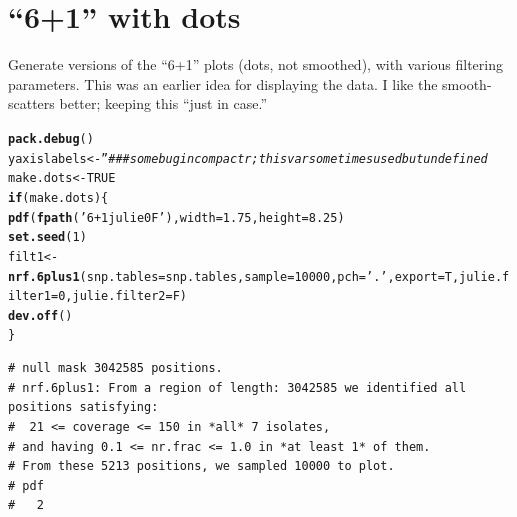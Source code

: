 \documentclass{article}\usepackage[]{graphicx}\usepackage[]{color}
\makeatletter
\newcommand{\hlnum}[1]{\textcolor[rgb]{0.686,0.059,0.569}{#1}}%
\newcommand{\hlstr}[1]{\textcolor[rgb]{0.192,0.494,0.8}{#1}}%
\newcommand{\hlcom}[1]{\textcolor[rgb]{0.678,0.584,0.686}{\textit{#1}}}%
\newcommand{\hlstd}[1]{\textcolor[rgb]{0.345,0.345,0.345}{#1}}%
\newcommand{\hlkwa}[1]{\textcolor[rgb]{0.161,0.373,0.58}{\textbf{#1}}}%
\newcommand{\hlkwb}[1]{\textcolor[rgb]{0.69,0.353,0.396}{#1}}%
\newcommand{\hlkwc}[1]{\textcolor[rgb]{0.333,0.667,0.333}{#1}}%
\newcommand{\hlkwd}[1]{\textcolor[rgb]{0.737,0.353,0.396}{\textbf{#1}}}%
\newenvironment{kframe}{%
 \def\at@end@of@kframe{}%
 \ifinner\ifhmode%
  \def\at@end@of@kframe{\end{minipage}}%
  \begin{minipage}{\columnwidth}%
 \fi\fi%
 \def\FrameCommand##1{\hskip\@totalleftmargin \hskip-\fboxsep
 \colorbox{shadecolor}{##1}\hskip-\fboxsep
     \hskip-\linewidth \hskip-\@totalleftmargin \hskip\columnwidth}%
 \MakeFramed {\advance\hsize-\width
   \@totalleftmargin\z@ \linewidth\hsize
   \@setminipage}}%
 {\par\unskip\endMakeFramed%
 \at@end@of@kframe}
\newenvironment{knitrout}{}{} %
\makeatother
\begin{document}
\section{``6+1'' with dots}

Generate versions of the ``6+1'' plots (dots, not smoothed), with various filtering parameters.  This was an earlier idea for displaying the data.  I like the smooth-scatters better; keeping this ``just in case.''

\begin{knitrout}\footnotesize
{}\color{fgcolor}\begin{kframe}
\begin{alltt}
\hlkwd{pack.debug}\hlstd{()}
\hlstd{yaxislabels} \hlkwb{<-} \hlstr{''} \hlcom{### some bug in compactr; this var sometimes used but undefined}
\hlstd{make.dots} \hlkwb{<-} \hlnum{TRUE}
\hlkwa{if}\hlstd{(make.dots)\{}
  \hlkwd{pdf}\hlstd{(}\hlkwd{fpath}\hlstd{(}\hlstr{'6+1julie0F'}\hlstd{),} \hlkwc{width}\hlstd{=}\hlnum{1.75}\hlstd{,} \hlkwc{height}\hlstd{=}\hlnum{8.25}\hlstd{)}
  \hlkwd{set.seed}\hlstd{(}\hlnum{1}\hlstd{)}
  \hlstd{filt1} \hlkwb{<-} \hlkwd{nrf.6plus1}\hlstd{(}\hlkwc{snp.tables}\hlstd{=snp.tables,}\hlkwc{sample}\hlstd{=}\hlnum{10000}\hlstd{,}\hlkwc{pch}\hlstd{=}\hlstr{'.'}\hlstd{,}\hlkwc{export}\hlstd{=T,}\hlkwc{julie.filter1}\hlstd{=}\hlnum{0}\hlstd{,}\hlkwc{julie.filter2}\hlstd{=F)}
  \hlkwd{dev.off}\hlstd{()}
\hlstd{\}}
\end{alltt}
\begin{verbatim}
# null mask 3042585 positions.
# nrf.6plus1: From a region of length: 3042585 we identified all positions satisfying: 
#  21 <= coverage <= 150 in *all* 7 isolates, 
# and having 0.1 <= nr.frac <= 1.0 in *at least 1* of them. 
# From these 5213 positions, we sampled 10000 to plot.
# pdf 
#   2
\end{verbatim}
\end{kframe}
\end{knitrout}
\end{document}
